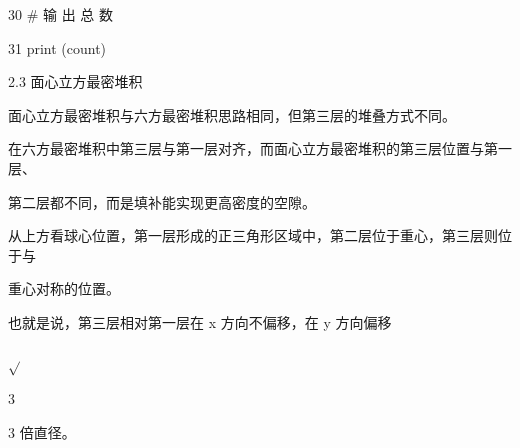 30 \# 输 出 总 数\par
31 print (count)\par
2.3 面心立方最密堆积\par
面心立方最密堆积与六方最密堆积思路相同，但第三层的堆叠方式不同。\par
在六方最密堆积中第三层与第一层对齐，而面心立方最密堆积的第三层位置与第一层、\par
第二层都不同，而是填补能实现更高密度的空隙。\par
从上方看球心位置，第一层形成的正三角形区域中，第二层位于重心，第三层则位于与\par
重心对称的位置。\par
也就是说，第三层相对第一层在 x 方向不偏移，在 y 方向偏移\par
$\sqrt{}$\par
3\par
3 倍直径。\par

